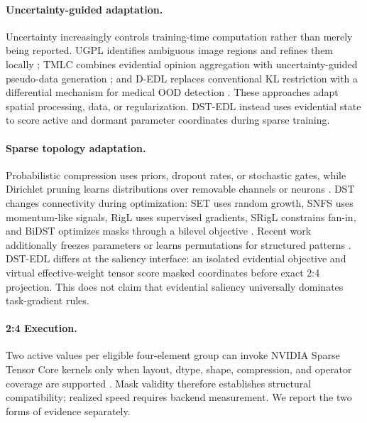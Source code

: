 \documentclass[letterpaper]{article}
\begin{document}
\paragraph{Uncertainty-guided adaptation.} Uncertainty increasingly controls training-time computation rather than merely being reported. UGPL identifies ambiguous image regions and refines them locally \cite{venkatraman2025ugpl}; TMLC combines evidential opinion aggregation with uncertainty-guided pseudo-data generation \cite{tang2026tmlc}; and D-EDL replaces conventional KL restriction with a differential mechanism for medical OOD detection \cite{fu2026dedl}. These approaches adapt spatial processing, data, or regularization. DST-EDL instead uses evidential state to score active and dormant parameter coordinates during sparse training.

\paragraph{Sparse topology adaptation.} Probabilistic compression uses priors, dropout rates, or stochastic gates, while Dirichlet pruning learns distributions over removable channels or neurons \cite{louizos2017bayesian,molchanov2017variational,louizos2018learning,adamczewski2021dirichlet}. DST changes connectivity during optimization: SET uses random growth, SNFS uses momentum-like signals, RigL uses supervised gradients, SRigL constrains fan-in, and BiDST optimizes masks through a bilevel objective \cite{mocanu2018scalable,dettmers2019sparse,evci2020rigging,lasby2023srigl,ji2024bidst}. Recent work additionally freezes parameters or learns permutations for structured patterns \cite{li2025pffdst,tyagi2025padst}. DST-EDL differs at the saliency interface: an isolated evidential objective and virtual effective-weight tensor score masked coordinates before exact 2:4 projection. This does not claim that evidential saliency universally dominates task-gradient rules.

\paragraph{2:4 Execution.} Two active values per eligible four-element group can invoke NVIDIA Sparse Tensor Core kernels only when layout, dtype, shape, compression, and operator coverage are supported \cite{mishra2021accelerating,nvidiacusparselt}. Mask validity therefore establishes structural compatibility; realized speed requires backend measurement. We report the two forms of evidence separately.
\end{document}

